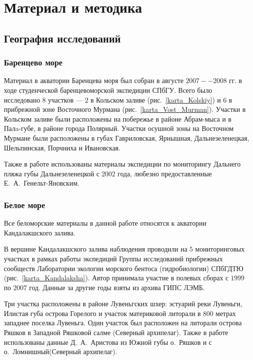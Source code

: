 \documentclass[12pt, a4paper]{disser}
\begin{document}
\chapter{Материал и методика}
	\section{География исследований}
		\subsection*{Баренцево море}
Материал  в акватории Баренцева моря  был  собран   в  августе  $2007--2008$  гг. в ходе   студенческой баренцевоморской экспедиции СПбГУ. 
Всего было исследовано $8$ участков --- $2$ в Кольском заливе (рис.~\ref{karta_Kolskiy})   и   $6$  в   прибрежной   зоне  Восточного  Мурмана (рис.~\ref{karta_Vost_Murman}).  
Участки   в   Кольском   заливе   были  расположены на побережье в районе Абрам-мыса и в Палa-губе, в районе города Полярный. 
Участки  осушной   зоны  на   Восточном   Мурмане   были   расположены   в   губах   Гавриловская,  Ярнышная, Дальнезеленецкая, Шельпинская, Порчниха и Ивановская.

Также в работе использованы материалы экспедиции по мониторингу Дальнего пляжа губы Дальнезеленецкой с 2002 года, любезно предоставленные Е.~А.~Генельт-Яновским. 



		\subsection*{Белое море}
Все беломорские материалы в данной работе относятся к акватории Кандалакшского залива. 

В вершине Кандалакшского залива наблюдения проводили на $5$ мониторинговых участках в рамках работы экспедиций Группы исследований прибрежных сообществ Лаборатории экологии морского бентоса (гидробиологии) СПбГДТЮ (рис.~\ref{karta_Kandalaksha}). 
Автор принимала участие в полевых сборах с $1999$ по $2007$ год.
Данные за другие годы взяты из архива ГИПС ЛЭМБ.

Три участка расположены в районе Лувеньгских шхер: эстуарий реки Лувеньги, Илистая губа острова Горелого и участок материковой литорали в 800 метрах западнее поселка Лувеньга.
Один участок был расположен на литорали острова Ряшков в Западной Ряшковой салме (Северный архипелаг).
Также в работе использованы данные Д.~А.~Аристова из Южной губы о.~Ряшков и с о.~Ломнишный(Северный архипелаг).
\end{document}

